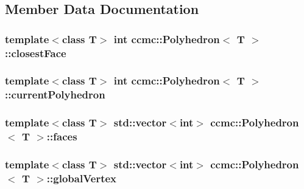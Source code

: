 \subsection{Member Data Documentation}
\hypertarget{classccmc_1_1_polyhedron_a50889e065612d1cd397cd7942349bb7b}{
\subsubsection[{closest\-Face}]{\setlength{\rightskip}{0pt plus 5cm}template$<$class T$>$ int {\bf ccmc\-::\-Polyhedron}$<$ T $>$\-::closest\-Face}}\label{classccmc_1_1_polyhedron_a50889e065612d1cd397cd7942349bb7b}
\hypertarget{classccmc_1_1_polyhedron_af684c14a5bfee6f3e29cdd1879da8aba}{
\subsubsection[{current\-Polyhedron}]{\setlength{\rightskip}{0pt plus 5cm}template$<$class T$>$ int {\bf ccmc\-::\-Polyhedron}$<$ T $>$\-::current\-Polyhedron}}\label{classccmc_1_1_polyhedron_af684c14a5bfee6f3e29cdd1879da8aba}
\hypertarget{classccmc_1_1_polyhedron_a85b5d967346fc1fd362b22bd0359cc4e}{
\subsubsection[{faces}]{\setlength{\rightskip}{0pt plus 5cm}template$<$class T$>$ std\-::vector$<$int$>$ {\bf ccmc\-::\-Polyhedron}$<$ T $>$\-::faces}}\label{classccmc_1_1_polyhedron_a85b5d967346fc1fd362b22bd0359cc4e}
\hypertarget{classccmc_1_1_polyhedron_aa16a2a05fcbafa0c99fc6b5de21672cc}{
\subsubsection[{global\-Vertex}]{\setlength{\rightskip}{0pt plus 5cm}template$<$class T$>$ std\-::vector$<$int$>$ {\bf ccmc\-::\-Polyhedron}$<$ T $>$\-::global\-Vertex}}\label{classccmc_1_1_polyhedron_aa16a2a05fcbafa0c99fc6b5de21672cc}

